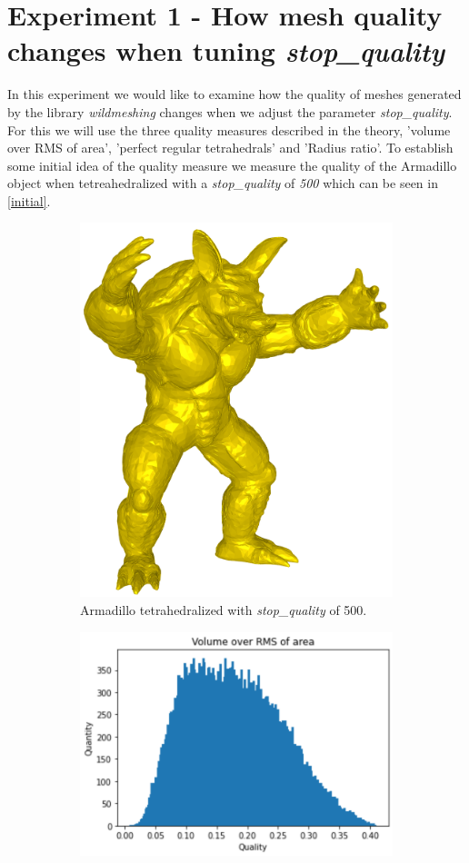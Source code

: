 \section{Experiment 1 - How mesh quality changes when tuning \textit{stop\_quality}}
In this experiment we would like to examine how the quality of meshes generated by the library \textit{wildmeshing} changes when we adjust the parameter \textit{stop\_quality}. For this we will use the three quality measures described in the theory, 'volume over RMS of area', 'perfect regular tetrahedrals' and 'Radius ratio'. To establish some initial idea of the quality measure we measure the quality of the Armadillo object when tetreahedralized with a \textit{stop\_quality} of \textit{500} which can be seen in \autoref{initial}.
\begin{figure}
	\centering
	\begin{subfigure}[b]{0.49\linewidth}
		\centering
		\includegraphics[height=0.75\linewidth]{Materials/E1/Armadillo500}
		\caption{Armadillo tetrahedralized with \textit{stop\_quality} of 500.}
	\end{subfigure}
	\hfill
	\begin{subfigure}[b]{0.49\linewidth}
		\centering
		\includegraphics[width=\linewidth]{Materials/E1/voa1}

\end{subfigure}
\end{figure}
